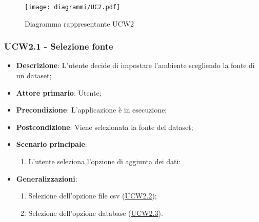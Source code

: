 \begin{figure}[h]
    \centering
    \texttt{[image: diagrammi/UC2.pdf]}
    \caption{Diagramma rappresentante UCW2}
    \label{fig:UCW2}
\end{figure}

\subsubsection{UCW2.1 - Selezione fonte}
\label{ssub:ucw2.1}
\begin{itemize}
    \item \textbf{Descrizione}: L'utente decide di impostare l'ambiente scegliendo la fonte di un dataset;

    \item \textbf{Attore primario}: Utente;

    \item \textbf{Precondizione}:   L'applicazione è in esecuzione;

    \item \textbf{Postcondizione}:  Viene selezionata la fonte del dataset;

    \item \textbf{Scenario principale}:
          \begin{enumerate}
              \item L'utente seleziona l'opzione di aggiunta dei dati:
          \end{enumerate}

    \item \textbf{Generalizzazioni}:
          \begin{enumerate}
              \item Selezione dell'opzione file csv (\hyperref[ssub:ucw2.2]{UCW2.2});
              \item Selezione dell'opzione database (\hyperref[ssub:ucw2.3]{UCW2.3}).
          \end{enumerate}
\end{itemize}



